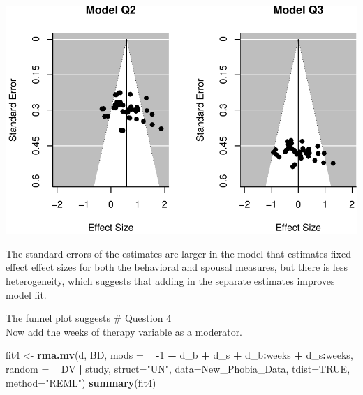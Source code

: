 \documentclass[]{article}
\newenvironment{Shaded}{\begin{snugshade}}{\end{snugshade}}
\newcommand{\KeywordTok}[1]{\textcolor[rgb]{0.13,0.29,0.53}{\textbf{#1}}}
\newcommand{\DataTypeTok}[1]{\textcolor[rgb]{0.13,0.29,0.53}{#1}}
\newcommand{\DecValTok}[1]{\textcolor[rgb]{0.00,0.00,0.81}{#1}}
\newcommand{\StringTok}[1]{\textcolor[rgb]{0.31,0.60,0.02}{#1}}
\newcommand{\OtherTok}[1]{\textcolor[rgb]{0.56,0.35,0.01}{#1}}
\newcommand{\OperatorTok}[1]{\textcolor[rgb]{0.81,0.36,0.00}{\textbf{#1}}}
\newcommand{\NormalTok}[1]{#1}
\begin{document}
\begin{center}\includegraphics{Beck_HW_9_R_1_files/figure-latex/unnamed-chunk-10-1} \end{center}

The standard errors of the estimates are larger in the model that
estimates fixed effect effect sizes for both the behavioral and spousal
measures, but there is less heterogeneity, which suggests that adding in
the separate estimates improves model fit.

The funnel plot suggests \# Question 4\\
Now add the weeks of therapy variable as a moderator.

\begin{Shaded}
\begin{Highlighting}[]
\NormalTok{fit4 <-}\StringTok{ }\KeywordTok{rma.mv}\NormalTok{(d, BD, }\DataTypeTok{mods =} \OperatorTok{~}\StringTok{ }\OperatorTok{-}\DecValTok{1} \OperatorTok{+}\StringTok{ }\NormalTok{d_b }\OperatorTok{+}\StringTok{ }\NormalTok{d_s }\OperatorTok{+}\StringTok{ }\NormalTok{d_b}\OperatorTok{:}\NormalTok{weeks }\OperatorTok{+}\StringTok{ }\NormalTok{d_s}\OperatorTok{:}\NormalTok{weeks, }\DataTypeTok{random =} \OperatorTok{~}\StringTok{ }\NormalTok{DV }\OperatorTok{|}\StringTok{ }\NormalTok{study, }\DataTypeTok{struct=}\StringTok{"UN"}\NormalTok{, }\DataTypeTok{data=}\NormalTok{New_Phobia_Data, }\DataTypeTok{tdist=}\OtherTok{TRUE}\NormalTok{, }\DataTypeTok{method=}\StringTok{"REML"}\NormalTok{)}
\KeywordTok{summary}\NormalTok{(fit4)}
\end{Highlighting}
\end{Shaded}
\end{document}
